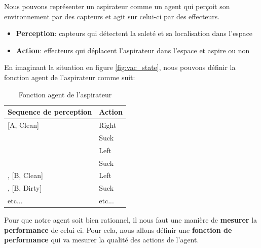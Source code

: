 \begin{example}\leavevmode
    Nous pouvons représenter un aspirateur comme un agent qui perçoit son environnement par des capteurs et agit sur celui-ci par des effecteurs.
    \begin{itemize}
        \item \textbf{Perception}: capteurs qui détectent la saleté et sa localisation dans l'espace
        \item \textbf{Action}: effecteurs qui déplacent l'aspirateur dans l'espace et aspire ou non
    \end{itemize}
    En imaginant la situation en figure \ref{fig:vac_state}, nous pouvons définir la fonction agent de l'aspirateur comme suit:
    \begin{table}[H]
        \caption{Fonction agent de l'aspirateur}\label{tab:agent_func}
        \begin{center}
            \begin{tabular}[c]{|l|l|}
                \hline
                \multicolumn{1}{|c|}{\textbf{Sequence de perception}} & 
                \multicolumn{1}{c|}{\textbf{Action}} \\
                \hline

                [A, Clean] & Right \\
                \hline
                [A, Dirty] & Suck \\
                \hline
                [B, Clean] & Left\\
                \hline
                [B, Dirty] & Suck\\
                \hline
                [A, Clean], [B, Clean] & Left\\
                \hline
                [A, Clean], [B, Dirty] & Suck\\
                \hline
                etc... & etc...\\
                \hline
            \end{tabular}
        \end{center}
    \end{table}
\end{example}

Pour que notre agent soit bien rationnel, il nous faut une manière de \textbf{mesurer} la \textbf{performance}
de celui-ci. Pour cela, nous allons définir une \textbf{fonction de performance} qui va mesurer la qualité des actions de l'agent.

